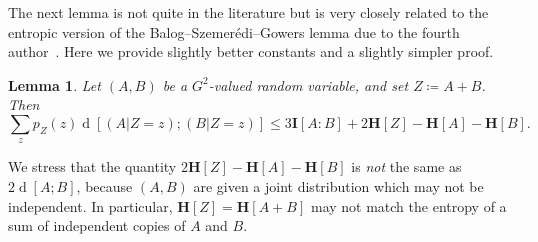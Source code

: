 \documentclass[12pt,reqno,tbtags]{amsart}
\newtheorem{lemma}[theorem]{Lemma}
\theoremstyle{definition}
\theoremstyle{remark}
\renewcommand{\leq}{\leqslant}
\newcommand{\ent}[1]{\mathbf{H}[#1]}
\newcommand{\I}[1]{\mathbf{I}[#1]}
\newcommand{\dist}[2]{{\operatorname{d}[#1;#2]}} %
\numberwithin{equation}{section}
\begin{document}
The next lemma is not quite in the literature but is very closely related to the entropic version of the Balog--Szemer\'edi--Gowers lemma due to the fourth author~\cite[Lemma 3.3]{tao-entropy}. Here we provide slightly better constants and a slightly simpler proof.
\begin{lemma}\label{lem-bsg}
  Let $(A,B)$ be a $G^2$-valued random variable, and set $Z \coloneqq A+B$.
Then
\begin{equation}\label{2-bsg-takeaway} \sum_{z} p_Z(z) \dist{(A | Z = z)}{(B | Z = z)} \leq 3\I{A:B} + 2 \ent{Z} - \ent{A} - \ent{B}. \end{equation}
\end{lemma}
We stress that the quantity $2 \ent{Z} - \ent{A} - \ent{B}$ is \emph{not} the same as $2\dist{A}{B}$, because $(A,B)$ are given a joint distribution which may not be independent. In particular, $\ent{Z}=\ent{A+B}$ may not match the entropy of a sum of independent copies of $A$ and $B$.
\end{document}
